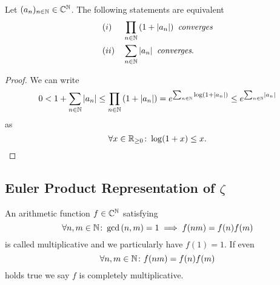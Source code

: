 \begin{lemma}
	Let $(a_n)_{n \in \mathbb{N}} \in \mathbb{C}^{\mathbb{N}}$. The following statements are equivalent
\begin{equation*}
\begin{aligned}
	&(i) &&\prod_{n \in \mathbb{N}} \left(1 + \left|a_n\right|\right) \textit{ converges} \\
	&(ii) &&\sum_{n \in \mathbb{N}} \left|a_n\right| \textit{ converges}.
\end{aligned}
\end{equation*}
\end{lemma}
\begin{proof}
	We can write
\begin{equation*}
	0 < 1 + \sum_{n \in \mathbb{N}} \left|a_n\right| \leq \prod_{n \in \mathbb{N}} \left(1 + \left|a_n\right|\right) = e^{\sum_{n \in \mathbb{N}} \log(1 + \left|a_n\right|)} \leq e^{\sum_{n \in \mathbb{N}} \left|a_n\right|}
\end{equation*}
	as
\begin{equation*}
	\forall x \in \mathbb{R}_{\geq 0} \colon \log(1 + x) \leq x.
\end{equation*}
\end{proof}


\subsection{Euler Product Representation of $\zeta$}


\begin{definition}
	An arithmetic function $f \in \mathbb{C}^{\mathbb{N}}$ satisfying
\begin{equation*}
	\forall n,m \in \mathbb{N} \colon \gcd\left(n, m\right) = 1 \implies f(n m) = f(n) f(m)
\end{equation*}
	is called multiplicative and we particularly have $f(1) = 1$. If even
\begin{equation*}
	\forall n,m \in \mathbb{N} \colon f(n m) = f(n) f(m)
\end{equation*}
	holds true we say $f$ is completely multiplicative.
\end{definition}


